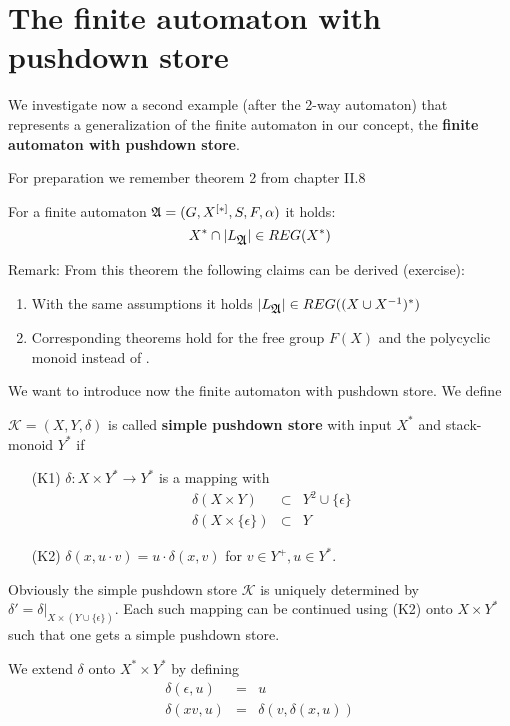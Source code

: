 \section{The finite automaton with pushdown store}

We investigate now a second example (after the 2-way automaton) that represents
a generalization of the finite automaton in our concept, the {\bf finite
automaton with pushdown store}.

For preparation we remember theorem 2 from chapter II.8

\begin{theorem}
For a finite automaton $\mbox{$\mathfrak{A}$} = (G, \mbox{${X}^{[*]}$}, S, F, \alpha)$ it holds:
\[ X^* \cap |L_{\mbox{$\mathfrak{A}$}}| \in REG(X^*) \]
\end{theorem}

Remark: From this theorem the following claims can be derived (exercise):
\begin{enumerate}
  \item With the same assumptions it holds $|L_{\mbox{$\mathfrak{A}$}}| \in REG((X\cup
  X^{-1})^*)$
  \item Corresponding theorems hold for the free group $F(X)$ and the polycyclic
  monoid  instead of .
\end{enumerate}
  
We want to introduce now the finite automaton with pushdown store. We define
\begin{definition}
$\mathcal{K} = (X, Y, \delta)$ is called {\bf simple pushdown store} with
input $X^*$ and stack-monoid $Y^*$ if
\begin{itemize}
  \item[(K1)] $\delta: X \times Y^* \to Y^*$ is a mapping with
  \begin{eqnarray*}
  \delta(X \times Y) & \subset & Y^2 \cup \{\epsilon\} \\
  \delta(X \times \{\epsilon\}) & \subset & Y
  \end{eqnarray*} 
  \item[(K2)] $\delta(x, u \cdot v) = u \cdot \delta(x, v)$ for $v \in Y^+,u \in
  Y^*$.
\end{itemize}
\end{definition} 

Obviously the simple pushdown store $\mathcal{K}$ is uniquely determined by
$\delta' = \delta |_{X \times (Y \cup \{\epsilon\})}$. Each such mapping can be
continued using (K2) onto $X \times Y^*$ such that one gets a simple
pushdown store.

We extend $\delta$ onto $X^* \times Y^*$ by defining
\begin{eqnarray*}
\delta(\epsilon, u) & = & u \\
\delta(x v, u) & = & \delta(v,  \delta(x,u))
\end{eqnarray*}

